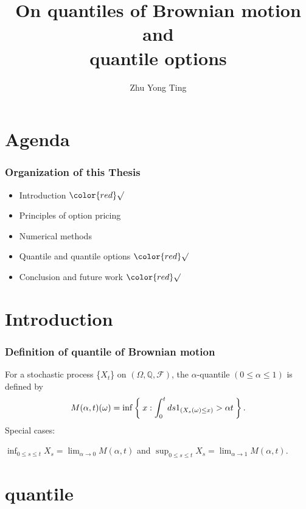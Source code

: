 \documentclass[cjk]{beamer}
\begin{document}
\title{On quantiles of Brownian motion and \\
quantile options}
\author{Zhu Yong Ting}
\date{} \frame{\titlepage}

\section{Agenda}
\begin{frame}
\frametitle{Organization of this Thesis}

\begin{itemize}
\item Introduction  $\color{red}\surd$
\item Principles of option pricing 
\item Numerical methods
\item Quantile and quantile options $\color{red}\surd$
\item Conclusion and future work $\color{red}\surd$
\end{itemize}
\end{frame}

\section{Introduction} 
\begin{frame}
\frametitle{Definition of quantile of Brownian motion}
For a stochastic process \{$X_t$\} on $(\Omega, \mathbb Q, \mathcal F)$, the $\alpha$-quantile $(0 \leq \alpha \leq 1)$
is defined by
\[
M(\alpha,t)(\omega) = \inf\Set{x:\int_0^t ds1_{(X_s (\omega)\leq x)} > \alpha t}.
\]
Special cases: 

$\displaystyle\inf_{0\leq s \leq t}  X_s = \lim_{\alpha\to 0}M(\alpha,t)$ and $\displaystyle\sup_{0\leq s \leq t} X_s = \lim_{\alpha\to 1} M(\alpha, t)$.
\end{frame}

\section{quantile}
\end{document}
